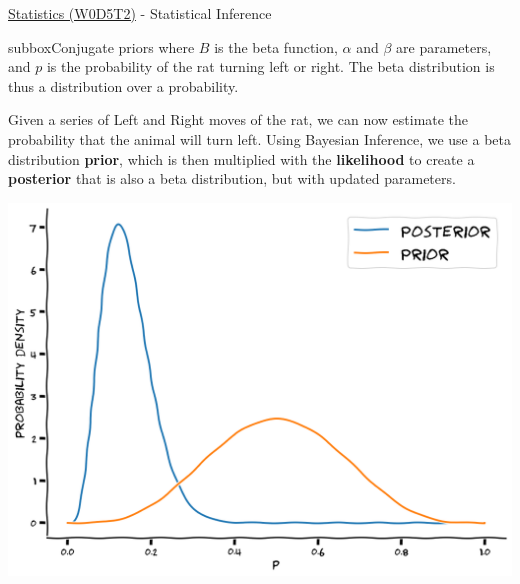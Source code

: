 \begin{textbox}{\href{https://compneuro.neuromatch.io/tutorials/W0D5_Statistics/student/W0D5_Tutorial2.html}{Statistics (W0D5T2)} - Statistical Inference}
\begin{subbox}{subbox}{Conjugate priors}
where $B$ is the beta function, $\alpha$ and $\beta$ are parameters, and $p$ is the probability of the rat turning left or right. The beta distribution is thus a distribution over a probability.

Given a series of Left and Right moves of the rat, we can now estimate the probability that the animal will turn left. Using Bayesian Inference, we use a beta distribution \textbf{prior}, which is then multiplied with the \textbf{likelihood} to create a \textbf{posterior} that is also a beta distribution, but with updated parameters. 

\centering
\includegraphics[scale=0.3]{Figures/PreCourse/SFigure3.png}

\end{subbox}
\end{textbox}